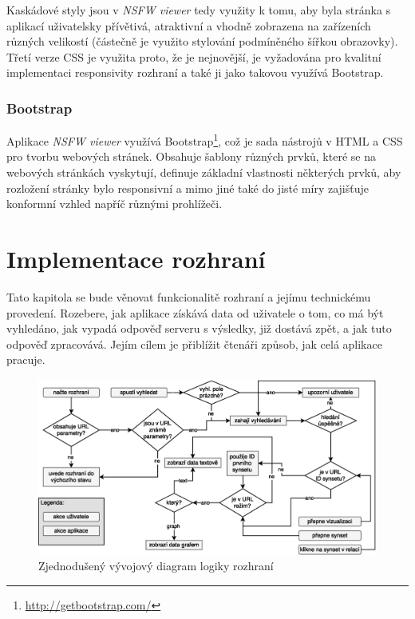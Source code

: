 \documentclass[a4paper, 11pt, oneside]{book}
\newcommand{\simplywn}{\textit{NSFW viewer} }
\begin{document}
				Kaskádové styly jsou v \simplywn tedy využity k tomu, aby byla stránka s aplikací uživatelsky přívětivá, atraktivní a vhodně zobrazena na zařízeních různých velikostí (částečně je využito stylování podmíněného šířkou obrazovky). Třetí verze CSS je využita proto, že je nejnovější, je vyžadována pro kvalitní implementaci responsivity rozhraní a také ji jako takovou využívá Bootstrap. 

				\subsection{Bootstrap}

					Aplikace \simplywn využívá Bootstrap\footnote{\url{http://getbootstrap.com/}}, což je sada nástrojů v HTML a CSS pro tvorbu webových stránek. Obsahuje šablony různých prvků, které se na webových stránkách vyskytují, definuje základní vlastnosti některých prvků, aby rozložení stránky bylo responsivní a mimo jiné také do jisté míry zajišťuje konformní vzhled napříč různými prohlížeči.

		\chapter{Implementace rozhraní}

			Tato kapitola se bude věnovat funkcionalitě rozhraní a jejímu technickému provedení. Rozebere, jak aplikace získává data od uživatele o tom, co má být vyhledáno, jak vypadá odpověď serveru s výsledky, již dostává zpět, a jak tuto odpověď zpracovává. Jejím cílem je přiblížit čtenáři způsob, jak celá aplikace pracuje.


			\begin{figure}[h]
				\centering
				\includegraphics[width=1.0\textwidth]{wordnet-ui-diag_v2.eps}
				\caption{Zjednodušený vývojový diagram logiky rozhraní}
				\label{fig:wordnet-ui-diag}
			\end{figure}
\end{document}
